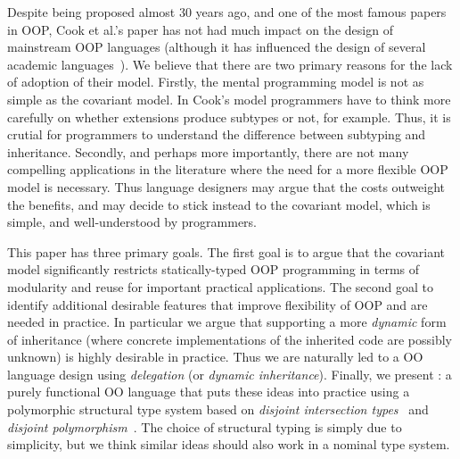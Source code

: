 \begin{comment}
\begin{itemize}

\item {\bf Inheritance and subtyping should be decoupled:} 
That is, there should be different mechanisms for class inheritance 
and class/interface subtyping. 

\item {\bf Extensions do not always produce subtypes:} 
There are cases where classes can inherit from other classes without 
producing subtypes. 

\end{itemize}

\end{comment}

Despite being proposed almost 30 years ago, and one of the most
famous papers in OOP, Cook et al.'s paper has not had much impact 
on the design of mainstream OOP languages (although it has influenced 
the design of several academic languages~\cite{}).
We believe that there are two primary reasons for the lack of adoption
of their model.  Firstly, the mental programming model is not
as simple as the covariant model. In Cook's model programmers have to
think more carefully on whether extensions produce subtypes or not,
for example.  Thus, it is crutial for programmers to understand the
difference between subtyping and inheritance.
Secondly, and perhaps more importantly, there are not many compelling applications in
the literature where the need for a more flexible OOP model is
necessary. Thus language designers may argue that the costs outweight 
the benefits, and may decide to stick instead to the covariant 
model, which is simple, and well-understood by programmers. 

This paper has three primary goals. The first goal is to argue that the
covariant model significantly restricts statically-typed OOP programming in
terms of modularity and reuse for important practical applications. The second
goal to identify additional desirable features that improve flexibility of OOP
and are needed in practice. In particular we argue that supporting a more
\emph{dynamic} form of inheritance (where concrete implementations of the
inherited code are possibly unknown) is highly desirable in practice. Thus we
are naturally led to a OO language design using \emph{delegation} (or
\emph{dynamic inheritance}). Finally, we present \name: a purely functional OO
language that puts these ideas into practice using a polymorphic structural type
system based on \emph{disjoint intersection types}~\cite{oliveira2016disjoint}
and \emph{disjoint polymorphism}~\cite{alpuimdisjoint}. The choice of structural
typing is simply due to simplicity, but we think similar ideas should also work
in a nominal type system.

